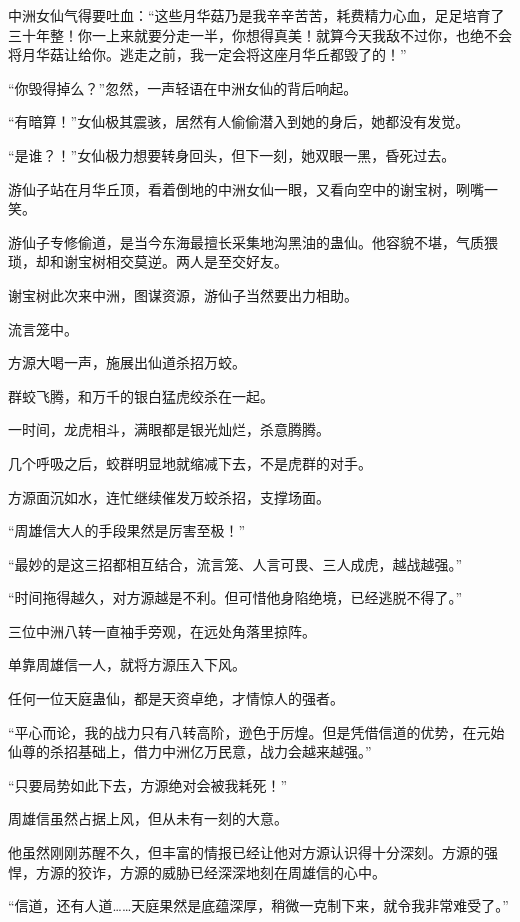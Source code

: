 \begin{this_body}
中洲女仙气得要吐血：“这些月华菇乃是我辛辛苦苦，耗费精力心血，足足培育了三十年整！你一上来就要分走一半，你想得真美！就算今天我敌不过你，也绝不会将月华菇让给你。逃走之前，我一定会将这座月华丘都毁了的！”

“你毁得掉么？”忽然，一声轻语在中洲女仙的背后响起。

“有暗算！”女仙极其震骇，居然有人偷偷潜入到她的身后，她都没有发觉。

“是谁？！”女仙极力想要转身回头，但下一刻，她双眼一黑，昏死过去。

游仙子站在月华丘顶，看着倒地的中洲女仙一眼，又看向空中的谢宝树，咧嘴一笑。

游仙子专修偷道，是当今东海最擅长采集地沟黑油的蛊仙。他容貌不堪，气质猥琐，却和谢宝树相交莫逆。两人是至交好友。

谢宝树此次来中洲，图谋资源，游仙子当然要出力相助。

流言笼中。

方源大喝一声，施展出仙道杀招万蛟。

群蛟飞腾，和万千的银白猛虎绞杀在一起。

一时间，龙虎相斗，满眼都是银光灿烂，杀意腾腾。

几个呼吸之后，蛟群明显地就缩减下去，不是虎群的对手。

方源面沉如水，连忙继续催发万蛟杀招，支撑场面。

“周雄信大人的手段果然是厉害至极！”

“最妙的是这三招都相互结合，流言笼、人言可畏、三人成虎，越战越强。”

“时间拖得越久，对方源越是不利。但可惜他身陷绝境，已经逃脱不得了。”

三位中洲八转一直袖手旁观，在远处角落里掠阵。

单靠周雄信一人，就将方源压入下风。

任何一位天庭蛊仙，都是天资卓绝，才情惊人的强者。

“平心而论，我的战力只有八转高阶，逊色于厉煌。但是凭借信道的优势，在元始仙尊的杀招基础上，借力中洲亿万民意，战力会越来越强。”

“只要局势如此下去，方源绝对会被我耗死！”

周雄信虽然占据上风，但从未有一刻的大意。

他虽然刚刚苏醒不久，但丰富的情报已经让他对方源认识得十分深刻。方源的强悍，方源的狡诈，方源的威胁已经深深地刻在周雄信的心中。

“信道，还有人道……天庭果然是底蕴深厚，稍微一克制下来，就令我非常难受了。”


\end{this_body}
